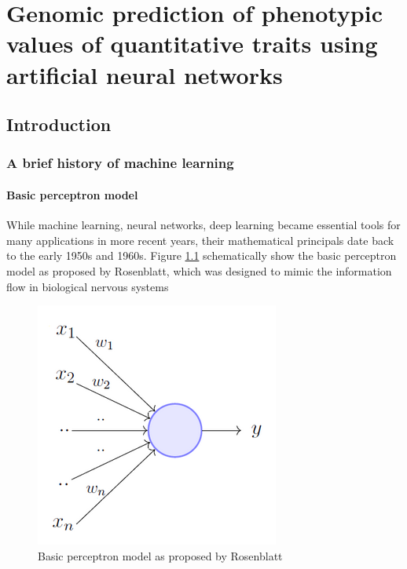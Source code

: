 \chapter{Genomic prediction of phenotypic values of quantitative traits using artificial neural networks}

\label{Chapter3} %




\section{Introduction}
\subsection{A brief history of machine learning} \label{introml}
\subsubsection{Basic perceptron model}

While machine learning, neural networks, deep learning became essential tools for many applications in more
recent years, their mathematical principals date back to the early 1950s and 1960s. Figure
\ref{fig:perceptron} schematically show the basic perceptron model as proposed by Rosenblatt, which was
designed to mimic the information flow in biological nervous systems \cite{rosenblatt1961}

\begin{figure}[th]
 \centering \includegraphics[height=.25\textheight, width=.5\textwidth]{Figures/perceptron.png} \decoRule
\caption[Basic perceptron model]{Basic perceptron model as proposed by Rosenblatt}
\label{fig:perceptron}
\end{figure}

